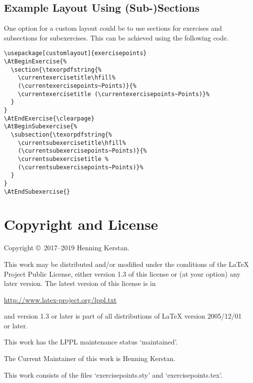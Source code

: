 \documentclass[
  twocolumn,%
  fontsize=9pt,%
  DIV=calc,%
  numbers=noendperiod%
]{scrartcl}
\begin{document}
\subsection{Example Layout Using (Sub-)Sections}
One option for a custom layout could be to use sections for exercises and subsections for subexercises. This can be achieved using the following code.

\begin{lstlisting}
\usepackage[customlayout]{exercisepoints}
\AtBeginExercise{%
  \section{\texorpdfstring{%
    \currentexercisetitle\hfill%
    (\currentexercisepoints~Points)}{%
    \currentexercisetitle (\currentexercisepoints~Points)}%
  }
}
\AtEndExercise{\clearpage}
\AtBeginSubexercise{%
  \subsection{\texorpdfstring{%
    \currentsubexercisetitle\hfill%
    (\currentsubexercisepoints~Points)}{%
    \currentsubexercisetitle %
    (\currentsubexercisepoints~Points)}%
  }
}
\AtEndSubexercise{}
\end{lstlisting}

\section{Copyright and License}
Copyright \copyright\ 2017--2019 Henning Kerstan.\medskip

\noindent This work may be distributed and/or modified under the conditions of the LaTeX Project Public License, either version 1.3 of this license or (at your option) any later version. The latest version of this license is in\medskip

   \url{http://www.latex-project.org/lppl.txt}\medskip

\noindent and version 1.3 or later is part of all distributions of LaTeX version 2005/12/01 or later.\medskip

\noindent This work has the LPPL maintenance status `maintained'.\medskip

\noindent The Current Maintainer of this work is Henning Kerstan.\medskip

\noindent This work consists of the files `exercisepoints.sty' and `exercisepoints.tex'.
\end{document}

